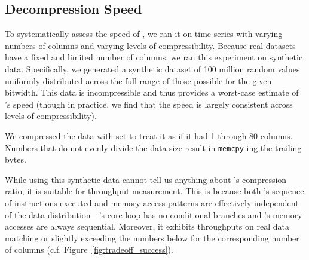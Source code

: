 \subsection{Decompression Speed} \label{sec:decomp_speed}

To systematically assess the speed of \minesp, we ran it on time series with varying numbers of columns and varying levels of compressibility. Because real datasets have a fixed and limited number of columns, we ran this experiment on synthetic data. Specifically, we generated a synthetic dataset of 100 million random values uniformly distributed across the full range of those possible for the given bitwidth. This data is incompressible and thus provides a worst-case estimate of \mine's speed (though in practice, we find that the speed is largely consistent across levels of compressibility).%

We compressed the data with \minesp set to treat it as if it had 1 through 80 columns. Numbers that do not evenly divide the data size result in \minesp \texttt{memcpy}-ing the trailing bytes.

While using this synthetic data cannot tell us anything about \mine's compression ratio, it is suitable for throughput measurement. This is because both \mine's sequence of instructions executed and memory access patterns are effectively independent of the data distribution---\mine's core loop has no conditional branches and \minesp's memory accesses are always sequential. Moreover, it exhibits throughputs on real data matching or slightly exceeding the numbers below for the corresponding number of columns (c.f. Figure~\ref{fig:tradeoff_success}). %

